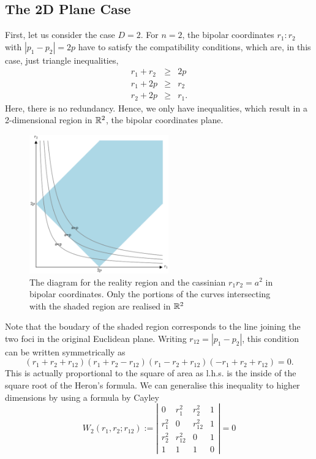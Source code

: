 \documentclass{article}
\begin{document}
\subsection{The 2D Plane Case}
\label{sec-1-4}
First, let us consider the case $D=2$. For $n=2$, the bipolar coordinates $r_1 :r_2$ with $|p_1 -p_2| =2p$ have to satisfy the compatibility conditions, which are, in this case, just triangle inequalities,
\begin{eqnarray}
 r_1 + r_2 & \ge & 2p \\
 r_1 +2p  & \ge & r_2  \\
 r_2 +2p  & \ge & r_1 .
\end{eqnarray}
Here, there is no redundancy. Hence, we only have inequalities, which result in a 2-dimensional region in $\mathbb R^2$, the bipolar coordinates plane.
\begin{figure}[h]
\begin{center}
\includegraphics[width=6cm]{images/2cass_bipo.eps}
\caption{The diagram for the reality region and the cassinian $r_1r_2=a^2$ in bipolar coordinates. Only the portions of the curves intersecting with the shaded region are realised in $\mathbb R^2$}
\label{ }
\end{center}
\end{figure}
Note that the boudary of the shaded region corresponds to the line joining the two foci in the original Euclidean plane. Writing $r_{12}=|p_1 -p_2|$, this condition can be written symmetrically as
\begin{equation}
\label{}
( r_1 + r_2 + r_{12})(r_1 + r_2 - r_{12})(r_1 - r_2 + r_{12})(-r_1 + r_2 + r_{12}) = 0.
\end{equation}
This is actually proportional to the square of area as l.h.s. is the inside of the square root of the Heron's formula. We can generalise this inequality to higher dimensions by using a formula by Cayley
\begin{equation}
\label{}
W_2(r_1,r_2;r_{12}) :=   \left|
\begin{array}{cccc}
0 &  r_1^2 & r_2^2 & 1 \\
r_1^2 & 0 & r_{12}^2 & 1\\
r_2^2 & r_{12}^2 & 0 & 1 \\
1 & 1 & 1 & 0
\end{array}\right|=0
\end{equation}
\end{document}
